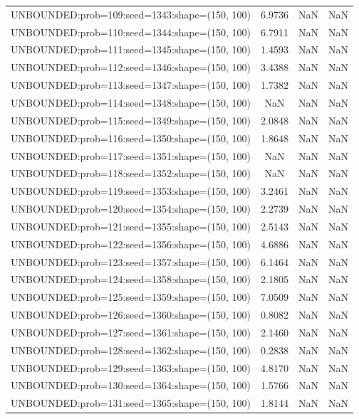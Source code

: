 \begin{longtable}{lccc}
UNBOUNDED:prob=109:seed=1343:shape=(150, 100) &  6.9736 &   NaN &    NaN \\
UNBOUNDED:prob=110:seed=1344:shape=(150, 100) &  6.7911 &   NaN &    NaN \\
UNBOUNDED:prob=111:seed=1345:shape=(150, 100) &  1.4593 &   NaN &    NaN \\
UNBOUNDED:prob=112:seed=1346:shape=(150, 100) &  3.4388 &   NaN &    NaN \\
UNBOUNDED:prob=113:seed=1347:shape=(150, 100) &  1.7382 &   NaN &    NaN \\
UNBOUNDED:prob=114:seed=1348:shape=(150, 100) &     NaN &   NaN &    NaN \\
UNBOUNDED:prob=115:seed=1349:shape=(150, 100) &  2.0848 &   NaN &    NaN \\
UNBOUNDED:prob=116:seed=1350:shape=(150, 100) &  1.8648 &   NaN &    NaN \\
UNBOUNDED:prob=117:seed=1351:shape=(150, 100) &     NaN &   NaN &    NaN \\
UNBOUNDED:prob=118:seed=1352:shape=(150, 100) &     NaN &   NaN &    NaN \\
UNBOUNDED:prob=119:seed=1353:shape=(150, 100) &  3.2461 &   NaN &    NaN \\
UNBOUNDED:prob=120:seed=1354:shape=(150, 100) &  2.2739 &   NaN &    NaN \\
UNBOUNDED:prob=121:seed=1355:shape=(150, 100) &  2.5143 &   NaN &    NaN \\
UNBOUNDED:prob=122:seed=1356:shape=(150, 100) &  4.6886 &   NaN &    NaN \\
UNBOUNDED:prob=123:seed=1357:shape=(150, 100) &  6.1464 &   NaN &    NaN \\
UNBOUNDED:prob=124:seed=1358:shape=(150, 100) &  2.1805 &   NaN &    NaN \\
UNBOUNDED:prob=125:seed=1359:shape=(150, 100) &  7.0509 &   NaN &    NaN \\
UNBOUNDED:prob=126:seed=1360:shape=(150, 100) &  0.8082 &   NaN &    NaN \\
UNBOUNDED:prob=127:seed=1361:shape=(150, 100) &  2.1460 &   NaN &    NaN \\
UNBOUNDED:prob=128:seed=1362:shape=(150, 100) &  0.2838 &   NaN &    NaN \\
UNBOUNDED:prob=129:seed=1363:shape=(150, 100) &  4.8170 &   NaN &    NaN \\
UNBOUNDED:prob=130:seed=1364:shape=(150, 100) &  1.5766 &   NaN &    NaN \\
UNBOUNDED:prob=131:seed=1365:shape=(150, 100) &  1.8144 &   NaN &    NaN \\

\end{longtable}
